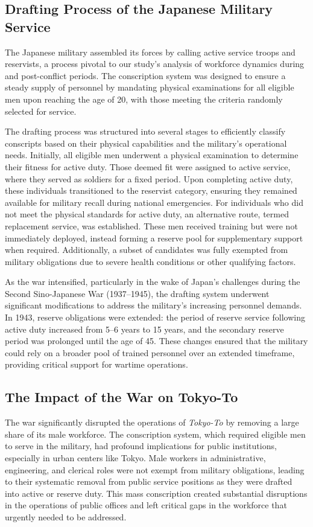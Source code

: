 \subsection{Drafting Process of the Japanese Military Service}
The Japanese military assembled its forces by calling active service troops and reservists, a process pivotal to our study’s analysis of workforce dynamics during and post-conflict periods. The conscription system was designed to ensure a steady supply of personnel by mandating physical examinations for all eligible men upon reaching the age of 20, with those meeting the criteria randomly selected for service.

The drafting process was structured into several stages to efficiently classify conscripts based on their physical capabilities and the military's operational needs. Initially, all eligible men underwent a physical examination to determine their fitness for active duty. Those deemed fit were assigned to active service, where they served as soldiers for a fixed period. Upon completing active duty, these individuals transitioned to the reservist category, ensuring they remained available for military recall during national emergencies. For individuals who did not meet the physical standards for active duty, an alternative route, termed replacement service, was established. These men received training but were not immediately deployed, instead forming a reserve pool for supplementary support when required. Additionally, a subset of candidates was fully exempted from military obligations due to severe health conditions or other qualifying factors.

As the war intensified, particularly in the wake of Japan’s challenges during the Second Sino-Japanese War (1937–1945), the drafting system underwent significant modifications to address the military's increasing personnel demands. In 1943, reserve obligations were extended: the period of reserve service following active duty increased from 5–6 years to 15 years, and the secondary reserve period was prolonged until the age of 45. These changes ensured that the military could rely on a broader pool of trained personnel over an extended timeframe, providing critical support for wartime operations.

\subsection{The Impact of the War on Tokyo-To}
The war significantly disrupted the operations of \emph{Tokyo-To} by removing a large share of its male workforce. The conscription system, which required eligible men to serve in the military, had profound implications for public institutions, especially in urban centers like Tokyo. Male workers in administrative, engineering, and clerical roles were not exempt from military obligations, leading to their systematic removal from public service positions as they were drafted into active or reserve duty. This mass conscription created substantial disruptions in the operations of public offices and left critical gaps in the workforce that urgently needed to be addressed.

